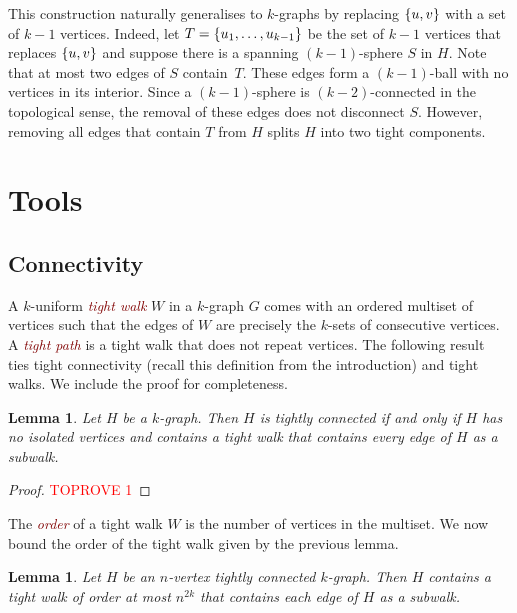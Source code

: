 \documentclass[12pt,reqno]{amsart}
\theoremstyle{plain}
\newtheorem{lemma}[theorem]{Lemma}
\theoremstyle{definition}
\numberwithin{equation}{section}
\DeclarePairedDelimiter{\set}{\{}{\}}
\newcommand{\defn}[1]{\textcolor{Maroon}{\emph{#1}}}
\begin{document}
	This construction naturally generalises to $k$-graphs by replacing $\set{u,v}$ with a set of $k - 1$ vertices.
	{Indeed, let $T = \set{u_1, \dotsc, u_{k - 1}}$ be the set of $k - 1$ vertices that replaces $\set{u, v}$ and suppose there is a spanning $(k - 1)$-sphere $S$ in $H$. Note that at most two edges of $S$ contain~$T$. These edges form a $(k - 1)$-ball with no vertices in its interior. Since a $(k - 1)$-sphere is $(k - 2)$-connected in the topological sense, the removal of these edges does not disconnect $S$. However, removing all edges that contain $T$ from $H$ splits $H$ into two tight components.}
	
	\section{Tools}\label{sec:tools}
	
	\subsection{Connectivity}
	
	A $k$-uniform \defn{tight walk} $W$ in a $k$-graph $G$ comes with an ordered multiset of vertices such that the edges of $W$ are precisely the $k$-sets of consecutive vertices. A \defn{tight path} is a tight walk that does not repeat vertices.
	The following result~\cite[Prop.~5.1]{LS23} ties tight connectivity (recall this definition from the introduction) and tight walks. We include the proof for completeness.
	
	\begin{lemma}\label{lem:tight-connectivity-walk}
		Let $H$ be a $k$-graph. Then $H$ is tightly connected if and only if $H$ has no isolated vertices and contains a tight walk that contains every edge of $H$ as a subwalk.
	\end{lemma}
	
	\begin{proof}\textcolor{red}{TOPROVE 1}\end{proof}
	
	The \defn{order} of a tight walk $W$ is the number of vertices in the multiset. We now bound the order of the tight walk given by the previous lemma.
	
	\begin{lemma}\label{lem:tight-connectivity-bounded-tight-walk}
		Let $H$ be an $n$-vertex tightly connected $k$-graph.
		Then $H$ contains a tight walk of order at most $n^{2k}$ that contains each edge of $H$ as a subwalk.
	\end{lemma}
	
\end{document}
